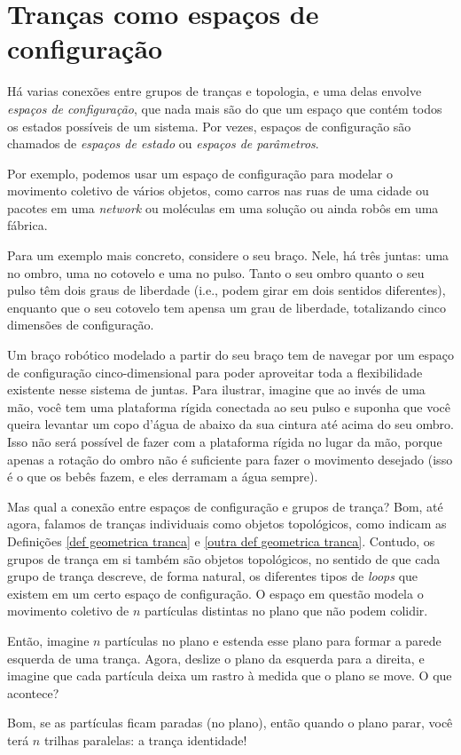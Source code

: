 \documentclass[a4paper,portuguese,11pt,twoside, leqno]{book}
\theoremstyle{definition}
\begin{document}
	\section{Tranças como espaços de configuração}\label{secao trancas como espacos de configuracao}
	\hspace{12pt} Há varias conexões entre grupos de tranças e topologia, e uma delas envolve \textit{espaços de configuração}, que nada mais são do que um espaço que contém todos os estados possíveis de um sistema. Por vezes, espaços de configuração são chamados de \textit{espaços de estado} ou \textit{espaços de parâmetros}.
	\par\vspace{0.3cm} Por exemplo, podemos usar um espaço de configuração para modelar o movimento coletivo de vários objetos, como carros nas ruas de uma cidade ou pacotes em uma \textit{network} ou moléculas em uma solução ou ainda robôs em uma fábrica.
	\par\vspace{0.3cm} Para um exemplo mais concreto, considere o seu braço. Nele, há três juntas: uma no ombro, uma no cotovelo e uma no pulso. Tanto o seu ombro quanto o seu pulso têm dois graus de liberdade (i.e., podem girar em dois sentidos diferentes), enquanto que o seu cotovelo tem apensa um grau de liberdade, totalizando cinco dimensões de configuração.
	\par\vspace{0.3cm} Um braço robótico modelado a partir do seu braço tem de navegar por um espaço de configuração cinco-dimensional para poder aproveitar toda a flexibilidade existente nesse sistema de juntas. Para ilustrar, imagine que ao invés de uma mão, você tem uma plataforma rígida conectada ao seu pulso e suponha que você queira levantar um copo d'água de abaixo da sua cintura até acima do seu ombro. Isso não será possível de fazer com a plataforma rígida no lugar da mão, porque apenas a rotação do ombro não é suficiente para fazer o movimento desejado (isso é o que os bebês fazem, e eles derramam a água sempre).
	\par\vspace{0.3cm} Mas qual a conexão entre espaços de configuração e grupos de trança? Bom, até agora, falamos de tranças individuais como objetos topológicos, como indicam as Definições \eqref{def geometrica tranca} e \eqref{outra def geometrica tranca}. Contudo, os grupos de trança em si também são objetos topológicos, no sentido de que cada grupo de trança descreve, de forma natural, os diferentes tipos de \textit{loops} que existem em um certo espaço de configuração. O espaço em questão modela o movimento coletivo de $n$ partículas distintas no plano que não podem colidir.
	\par\vspace{0.3cm} Então, imagine $n$ partículas no plano e estenda esse plano para formar a parede esquerda de uma trança. Agora, deslize o plano da esquerda para a direita, e imagine que cada partícula deixa um rastro à medida que o plano se move. O que acontece?
	\par\vspace{0.3cm} Bom, se as partículas ficam paradas (no plano), então quando o plano parar, você terá $n$ trilhas paralelas: a trança identidade! 
	
\end{document}
